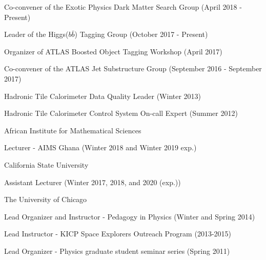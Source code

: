 \documentclass[10pt]{article}
\newenvironment{outerlist}[1][\enskip\textbullet]%
        {\begin{itemize}[#1]}{\end{itemize}%
         \vspace{-.6\baselineskip}}
\newenvironment{innerlist}[1][\enskip\textbullet]%
        {\begin{compactitem}[#1]}{\end{compactitem}}
\begin{document}
\begin{outerlist}
\begin{innerlist}
\item Co-convener of the Exotic Physics Dark Matter Search Group (April 2018 - Present)
\item Leader of the Higgs($b\bar{b}$) Tagging Group (October 2017 - Present)
\item Organizer of ATLAS Boosted Object Tagging Workshop (April 2017)
\item Co-convener of the ATLAS Jet Substructure Group (September 2016 - September 2017)
\item Hadronic Tile Calorimeter Data Quality Leader (Winter 2013)
\item Hadronic Tile Calorimeter Control System On-call Expert (Summer 2012) 
\end{innerlist}
\item[] African Institute for Mathematical Sciences
\begin{innerlist}
\item Lecturer - AIMS Ghana (Winter 2018 and Winter 2019 exp.)
\end{innerlist}
\item[] California State University
\begin{innerlist}
\item Assistant Lecturer (Winter 2017, 2018, and 2020 (exp.))
\end{innerlist}
\item[] The University of Chicago
\begin{innerlist}
\item Lead Organizer and Instructor - Pedagogy in Physics (Winter and Spring 2014)
\item Lead Instructor - KICP Space Explorers Outreach Program (2013-2015)
\item Lead Organizer - Physics graduate student seminar series (Spring 2011)
\end{innerlist}
\end{outerlist}
\end{document}
